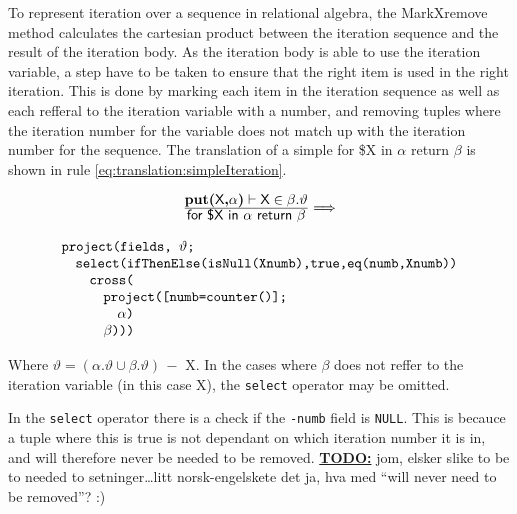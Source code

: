 To represent iteration over a sequence in relational algebra, the MarkXremove method calculates the cartesian
product between the iteration sequence and the result of the iteration body. As the iteration body is able to use
the iteration variable, a step have to be taken to ensure that the right item is used in the right iteration. This
is done by marking each item in the iteration sequence as well as each refferal to the iteration variable with a
number, and removing tuples where the iteration number for the variable does not match up with the iteration
number for the sequence. The translation of a simple \textsf{for \$X in} $\alpha$ \textsf{return} $\beta$ is shown
in rule \ref{eq:translation:simpleIteration}.

\begin{equation}
\centering
\begin{array}{c}
	\frac{\displaystyle \textbf{put(}\textsf{X}\textbf{,}\alpha\textbf{)}\vdash\textsf{X}\in\beta . \vartheta}
	{\displaystyle \textsf{for \$X in }\alpha	\textsf{ return }\beta}
	
	\Longrightarrow 
	\\
	\mbox{} \\
	
	\begin{array}{l}
	\mbox{\texttt{project(fields, }} \vartheta \mbox{\texttt{;}} \\ \quad
	\mbox{\texttt{select(ifThenElse(isNull(Xnumb),true,eq(numb,Xnumb))}} \\ \quad \quad 
	\mbox{\texttt{cross(}} \\ \quad \quad \quad
	\mbox{\texttt{project([numb=counter()];}} \\ \quad \quad \quad \quad
	\alpha \mbox{\texttt{)}} \\ \quad \quad \quad 
	\beta \mbox{\texttt{)))}}
	\end{array}
\end{array}
\label{eq:translation:simpleIteration}
\end{equation}

Where $\vartheta = (\alpha.\vartheta \cup \beta.\vartheta)\, -$ \textsf{X}. In the cases where $\beta$ does not
reffer to the iteration variable (in this case \textsf{X}), the \texttt{select} operator may be omitted.

In the \texttt{select} operator there is a check if the \texttt{-numb} field is \texttt{NULL}. This is becauce a
tuple where this is true is not dependant on which iteration number it is in, and will therefore never be needed
to be removed. \underline{\textbf{\Large TODO:}} jom, elsker slike to be to
needed to setninger\ldots litt norsk-engelskete det ja, hva med ``will never
need to be removed''? :)

